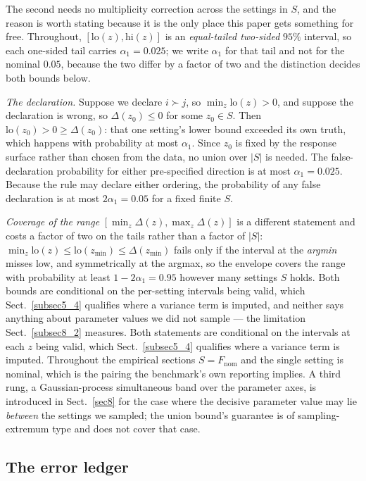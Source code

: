 \documentclass[pdflatex,iicol,sn-apa]{sn-jnl}
\theoremstyle{remark}
\begin{document}
\noindent The second needs no multiplicity correction across the settings in $S$, and the reason is
worth stating because it is the only place this paper gets something for free. Throughout,
$[\mathrm{lo}(z), \mathrm{hi}(z)]$ is an \emph{equal-tailed two-sided} $95\%$ interval, so each
one-sided tail carries $\alpha_1 = 0.025$; we write $\alpha_1$ for that tail and not for the nominal
$0.05$, because the two differ by a factor of two and the distinction decides both bounds below.

\emph{The declaration.} Suppose we declare $i \succ j$, so $\min_z \mathrm{lo}(z) > 0$, and suppose
the declaration is wrong, so $\Delta(z_0) \le 0$ for some $z_0 \in S$. Then
$\mathrm{lo}(z_0) > 0 \ge \Delta(z_0)$: that one setting's lower bound exceeded its own truth, which
happens with probability at most $\alpha_1$. Since $z_0$ is fixed by the response surface rather
than chosen from the data, no union over $|S|$ is needed. The false-declaration probability for either
pre-specified direction is at most $\alpha_1 = 0.025$. Because the rule may declare either ordering,
the probability of any false declaration is at most $2\alpha_1 = 0.05$ for a fixed finite $S$.

\emph{Coverage of the range} $[\min_z \Delta(z), \max_z \Delta(z)]$ is a different statement and
costs a factor of two on the tails rather than a factor of $|S|$:
$\min_z \mathrm{lo}(z) \le \mathrm{lo}(z_{\min}) \le \Delta(z_{\min})$ fails only if the interval at
the \emph{argmin} misses low, and symmetrically at the argmax, so the envelope covers the range with
probability at least $1 - 2\alpha_1 = 0.95$ however many settings $S$ holds. Both bounds are
conditional on the per-setting intervals being valid, which Sect.~\ref{subsec5_4} qualifies where a
variance term is imputed, and neither says anything about parameter values we did not sample --- the
limitation Sect.~\ref{subsec8_2} measures. Both
statements are conditional on the intervals at each $z$ being valid, which Sect.~\ref{subsec5_4}
qualifies where a variance term is imputed.
Throughout the empirical sections $S = F_{\mathrm{nom}}$ and the single setting is nominal, which is
the pairing the benchmark's own reporting implies.
A third rung, a Gaussian-process simultaneous band over the parameter axes, is introduced in
Sect.~\ref{sec8} for the case where the decisive parameter value may lie \emph{between} the settings
we sampled; the union bound's guarantee is of sampling-extremum type and does not cover that case.

\subsection{The error ledger}\label{subsec3_4}
\end{document}
